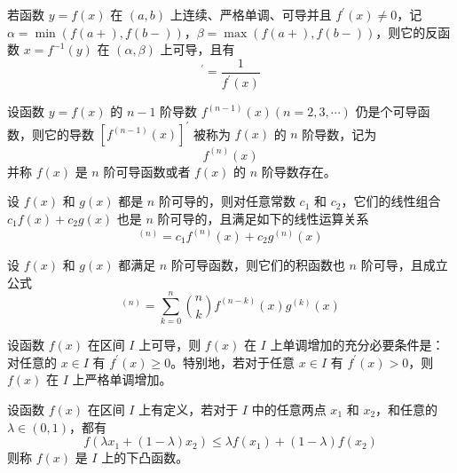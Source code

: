 \documentclass{ctexbook}
\begin{document}
\begin{theorem}[反函数求导定理]
    若函数 $y=f(x)$ 在 $(a,b)$ 上连续、严格单调、可导并且 $f^\prime(x)\neq 0$，记 $\alpha =\min(f(a+),f(b-))$，$\beta=\max(f(a+),f(b-))$，则它的反函数 $x=f^{-1}(y)$ 在 $(\alpha,\beta)$ 上可导，且有
    \begin{equation}
        [f^{-1}(y)]^\prime =\frac{1}{f^\prime(x)}
    \end{equation}
\end{theorem}

\begin{definition}[高阶导数]
    设函数 $y=f(x)$ 的 $n-1$ 阶导数 $f^{(n-1)}(x)(n=2,3,\cdots)$ 仍是个可导函数，则它的导数 $[f^{(n-1)}(x)]^\prime$ 被称为 $f(x)$ 的 $n$ 阶导数，记为
    \begin{equation}
        f^{(n)}(x)
    \end{equation}
    并称 $f(x)$ 是 $n$ 阶可导函数或者 $f(x)$ 的 $n$ 阶导数存在。
\end{definition}

\begin{theorem}[线性组合函数的高阶导数]
    设 $f(x)$ 和 $g(x)$ 都是 $n$ 阶可导的，则对任意常数 $c_1$ 和 $c_2$，它们的线性组合 $c_1f(x)+c_2g(x)$ 也是 $n$ 阶可导的，且满足如下的线性运算关系
    \begin{equation}
        [c_1f(x)+c_2g(x)]^{(n)}=c_1f^{(n)}(x)+c_2g^{(n)}(x)
    \end{equation}
\end{theorem}

\begin{theorem}[Leibniz 公式]
    设 $f(x)$ 和 $g(x)$ 都满足 $n$ 阶可导函数，则它们的积函数也 $n$ 阶可导，且成立公式
    \begin{equation}
        [f(x)\cdot g(x)]^{(n)}=\sum_{k=0}^n \binom{n}{k}f^{(n-k)}(x)g^{(k)}(x)
    \end{equation}    
\end{theorem}

\begin{theorem}[一阶导数与单调性的关系]
    设函数 $f(x)$ 在区间 $I$ 上可导，则 $f(x)$ 在 $I$ 上单调增加的充分必要条件是：对任意的 $x\in I$ 有 $f^\prime(x)\geq 0$。特别地，若对于任意 $x\in I$ 有 $f^\prime(x)>0$，则 $f(x)$ 在 $I$ 上严格单调增加。
\end{theorem}

\begin{definition}[下凸函数]
    设函数 $f(x)$ 在区间 $I$ 上有定义，若对于 $I$ 中的任意两点 $x_1$ 和 $x_2$，和任意的 $\lambda\in(0,1)$，都有
    \begin{equation}
        f(\lambda x_1+(1-\lambda)x_2)\leq \lambda f(x_1)+(1-\lambda)f(x_2)
    \end{equation}
    则称 $f(x)$ 是 $I$ 上的下凸函数。
\end{definition}
\end{document}
